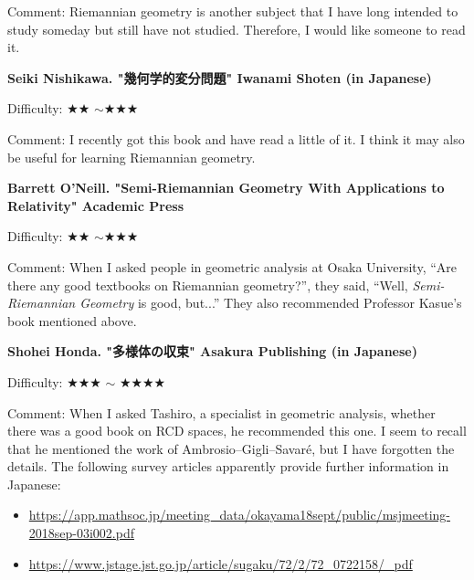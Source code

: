 Comment: Riemannian geometry is another subject that I have long intended to study someday but still have not studied. Therefore, I would like someone to read it.

\vspace{8pt}

\textbf{Seiki Nishikawa. "幾何学的変分問題" Iwanami Shoten (in Japanese)}　\vspace{-6pt}

Difficulty: ★★ $\sim$★★★　\vspace{-6pt}

Comment: I recently got this book and have read a little of it. I think it may also be useful for learning Riemannian geometry. 

\vspace{8pt}


\textbf{Barrett O'Neill. "Semi-Riemannian Geometry With Applications to Relativity" Academic Press}  　\vspace{-6pt} 

Difficulty: ★★ $\sim$★★★\vspace{-6pt} 

Comment: When I asked people in geometric analysis at Osaka University, ``Are there any good textbooks on Riemannian geometry?'', they said, ``Well, \emph{Semi-Riemannian Geometry} is good, but...'' They also recommended Professor Kasue's book mentioned above.

\vspace{8pt}

\textbf{Shohei Honda. "多様体の収束" Asakura Publishing (in Japanese)} \vspace{-6pt}

Difficulty: ★★★ $\sim$ ★★★★ \vspace{-6pt}

Comment: When I asked Tashiro, a specialist in geometric analysis, whether there was a good book on RCD spaces, he recommended this one. I seem to recall that he mentioned the work of Ambrosio--Gigli--Savaré, but I have forgotten the details. The following survey articles apparently provide further information in Japanese:
\begin{itemize}
\item  \url{https://app.mathsoc.jp/meeting_data/okayama18sept/public/msjmeeting-2018sep-03i002.pdf}
\item \url{https://www.jstage.jst.go.jp/article/sugaku/72/2/72_0722158/_pdf}
\end{itemize}

\vspace{8pt}

